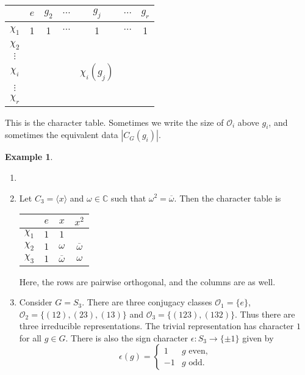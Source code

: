 \documentclass[12pt]{article}
\theoremstyle{definition}
\newtheorem{example}{Example}[section]
\theoremstyle{remark}
\begin{document}
\begin{center}
\begin{tabular}{c|cccccc}
	 & $e$ & $g_2$ & $\cdots$ & $g_j$ & $\cdots$ & $g_r$ \\
	 \hline
	$\chi_1$ & 1 & 1 & $\cdots$ & 1 & $\cdots$ & 1 \\
	$\chi_2$ &  &  &  &  &  &  \\
	$\vdots$ &  &  &  &  &  &  \\
	$\chi_i$ &  &  &  & $\chi_i(g_j)$ &  &  \\
	$\vdots$ &  &  &  &  &  &  \\
	$\chi_r$ &  &  &  &  &  &  \\
\end{tabular}
\end{center}
This is the character table. Sometimes we write the size of $\mathcal{O}_i$ above $g_i$, and sometimes the equivalent data $|C_G(g_i)|$.

\begin{adjustbox}{minipage = \columnwidth - 25.5pt, margin=1em, frame=1pt, margin=0em}
\begin{example}
	\begin{enumerate}[1.]
		\item[]
		\item Let $C_3 = \langle x \rangle$ and $\omega \in \mathbb{C}$ such that $\omega^2 = \overline{\omega}$. Then the character table is
			\begin{center}
\begin{tabular}{c|ccc}
	 & $e$ & $x$ & $x^2$ \\
	 \hline
	$\chi_1$ & $1$ & $1$ &  \\
	$\chi_2$ & $1$ & $\omega$ & $\overline{\omega}$ \\
	$\chi_3$ & $1$ & $\overline{\omega}$ & $\omega$ \\
\end{tabular}
			\end{center}
		Here, the rows are pairwise orthogonal, and the columns are as well.
	\item Consider $G = S_3$. There are three conjugacy classes $\mathcal{O}_1 = \{e\}$, $\mathcal{O}_2 = \{(12), (23), (13)\}$ and $\mathcal{O}_3 = \{(123),(132)\}$. Thus there are three irreducible representations. The trivial representation has character $1$ for all $g \in G$. There is also the sign character $\epsilon : S_3 \to \{\pm 1\}$ given by
		\[
			\epsilon(g) =
			\begin{cases}
				1 & g \text{ even}, \\
				-1 & g \text{ odd}.
			\end{cases}
		\]
	\end{enumerate}
\end{example}
\end{adjustbox}
\end{document}
